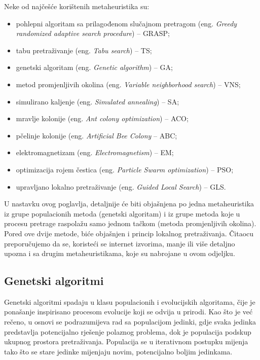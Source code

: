 \documentclass[a4paper, utf8, 11pt, colorlinks]{book}
\theoremstyle{definition}
\begin{document}
 Neke od najčešće korištenih metaheuristika su:
 \begin{itemize}
 	\item pohlepni algoritam sa prilagođenom slučajnom pretragom (eng. \emph{Greedy randomized adaptive search procedure}) -- GRASP;
 	\item tabu pretraživanje (eng. \emph{Tabu search}) -- TS;
 	\item genetski algoritam (eng. \emph{Genetic algorithm}) -- GA;
 	\item metod promjenljivih okolina (eng. \emph{Variable neighborhood search}) -- VNS;
 	\item simulirano kaljenje (eng. \emph{Simulated annealing}) -- SA;
 	\item mravlje kolonije (eng. \emph{Ant colony optimization}) -- ACO;
 	\item pčelinje kolonije (eng. \emph{Artificial Bee Colony} -- ABC;
 	\item elektromagnetizam (eng. \emph{Electromagnetism}) -- EM;
 	\item optimizacija rojem čestica (eng. \emph{Particle Swarm optimization}) -- PSO;
 	\item upravljano lokalno pretraživanje (eng. \emph{Guided Local Search})  -- GLS.
 \end{itemize}

U nastavku ovog poglavlja, detaljnije će biti objašnjena po jedna metaheuristika iz grupe populacionih metoda (genetski algoritam) i iz grupe metoda koje u procesu pretrage raspolažu samo jednom tačkom (metoda promjenljivih okolina). Pored ove dvije metode, biće objašnjen i princip lokalnog pretraživanja. Čitaocu preporučujemo da se, koristeći se internet izvorima, manje ili više detaljno upozna i sa drugim metaheuristikama, koje su nabrojane u ovom odjeljku.


\subsection{Genetski algoritmi}\label{intro:ga}


Genetski algoritmi spadaju u klasu populacionih i evolucijskih algoritama, čije je ponašanje inspirisano procesom evolucije koji se odvija u prirodi.
Kao što je već rečeno, u osnovi se podrazumijeva rad sa populacijom jedinki, gdje svaka jedinka predstavlja potencijalno rješenje polaznog problema, dok je populacija  podskup ukupnog prostora pretraživanja. Populacija se u iterativnom postupku mijenja tako što se stare jedinke mijenjaju novim, potencijalno boljim jedinkama.
\end{document}
